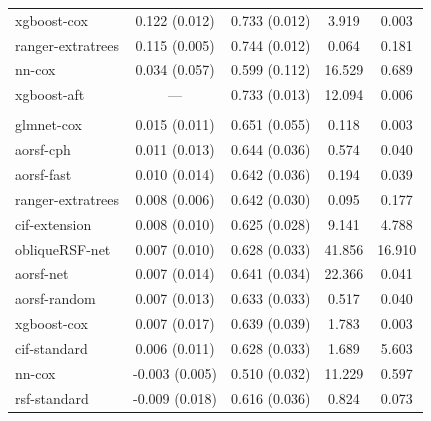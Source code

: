 \documentclass{article}\usepackage[]{graphicx}\usepackage[]{xcolor}
\newenvironment{knitrout}{}{} %
\begin{document}
\begin{knitrout}
\begin{longtable}[t]{lcccc}
\hspace{1em}xgboost-cox & 0.122 (0.012) & 0.733 (0.012) & 3.919 & 0.003\\
\hspace{1em}ranger-extratrees & 0.115 (0.005) & 0.744 (0.012) & 0.064 & 0.181\\
\hspace{1em}nn-cox & 0.034 (0.057) & 0.599 (0.112) & 16.529 & 0.689\\
\hspace{1em}xgboost-aft & --- & 0.733 (0.013) & 12.094 & 0.006\\
\addlinespace[0.3em]
\multicolumn{5}{l}{\textit{\textbf{Monoclonal gammopathy; malignancy, n = 1384, p = 8}}}\\
\hline
\hspace{1em}glmnet-cox & 0.015 (0.011) & 0.651 (0.055) & 0.118 & 0.003\\
\hspace{1em}aorsf-cph & 0.011 (0.013) & 0.644 (0.036) & 0.574 & 0.040\\
\hspace{1em}aorsf-fast & 0.010 (0.014) & 0.642 (0.036) & 0.194 & 0.039\\
\hspace{1em}ranger-extratrees & 0.008 (0.006) & 0.642 (0.030) & 0.095 & 0.177\\
\hspace{1em}cif-extension & 0.008 (0.010) & 0.625 (0.028) & 9.141 & 4.788\\
\hspace{1em}obliqueRSF-net & 0.007 (0.010) & 0.628 (0.033) & 41.856 & 16.910\\
\hspace{1em}aorsf-net & 0.007 (0.014) & 0.641 (0.034) & 22.366 & 0.041\\
\hspace{1em}aorsf-random & 0.007 (0.013) & 0.633 (0.033) & 0.517 & 0.040\\
\hspace{1em}xgboost-cox & 0.007 (0.017) & 0.639 (0.039) & 1.783 & 0.003\\
\hspace{1em}cif-standard & 0.006 (0.011) & 0.628 (0.033) & 1.689 & 5.603\\
\hspace{1em}nn-cox & -0.003 (0.005) & 0.510 (0.032) & 11.229 & 0.597\\
\hspace{1em}rsf-standard & -0.009 (0.018) & 0.616 (0.036) & 0.824 & 0.073\\

\end{longtable}
\end{knitrout}
\end{document}
